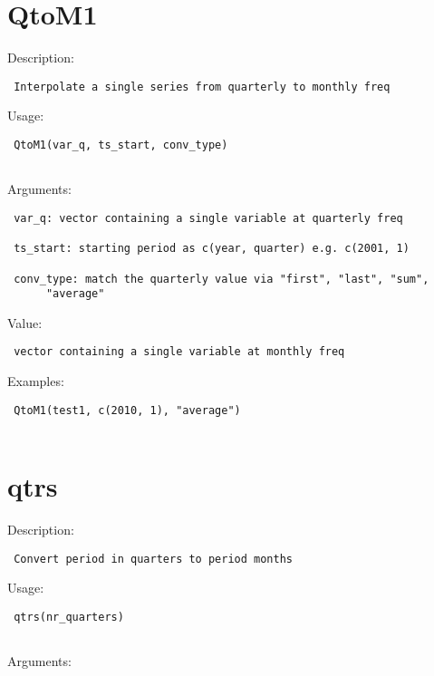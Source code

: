 \documentclass[
  letterpaper,
  DIV=11,
  numbers=noendperiod]{scrreport}
\begin{document}
\hypertarget{qtom1}{%
\section{QtoM1}\label{qtom1}}

Description:

\begin{verbatim}
 Interpolate a single series from quarterly to monthly freq
\end{verbatim}

Usage:

\begin{verbatim}
 QtoM1(var_q, ts_start, conv_type)
 
\end{verbatim}

Arguments:

\begin{verbatim}
 var_q: vector containing a single variable at quarterly freq

 ts_start: starting period as c(year, quarter) e.g. c(2001, 1)

 conv_type: match the quarterly value via "first", "last", "sum",
      "average"
\end{verbatim}

Value:

\begin{verbatim}
 vector containing a single variable at monthly freq
\end{verbatim}

Examples:

\begin{verbatim}
 QtoM1(test1, c(2010, 1), "average")
 
\end{verbatim}

\hypertarget{qtrs}{%
\section{qtrs}\label{qtrs}}

Description:

\begin{verbatim}
 Convert period in quarters to period months
\end{verbatim}

Usage:

\begin{verbatim}
 qtrs(nr_quarters)
 
\end{verbatim}

Arguments:
\end{document}
